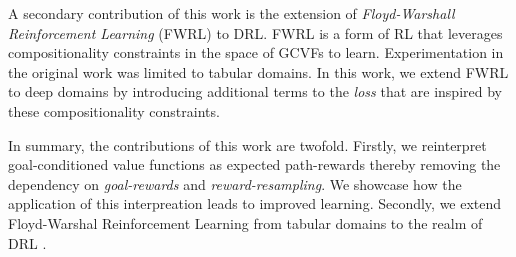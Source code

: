 A secondary contribution of this work is the extension of
\emph{Floyd-Warshall Reinforcement Learning} (FWRL)
\citep{dhiman2018floydwarshall} to DRL.  FWRL is a form of RL that
leverages compositionality constraints in the space of GCVFs to learn.
Experimentation in the original work was limited to tabular domains. In
this work, we extend FWRL to deep domains by introducing additional
terms to the \emph{loss} that are inspired by these compositionality
constraints. 

In summary, the  contributions of this work are twofold. Firstly, we
reinterpret goal-conditioned value functions as expected path-rewards
thereby removing the dependency on \emph{goal-rewards} and
\emph{reward-resampling}.
We showcase how the application of this interpreation leads to improved
learning. Secondly, we extend Floyd-Warshal Reinforcement Learning from
tabular domains to the realm of DRL \cite{}. 








